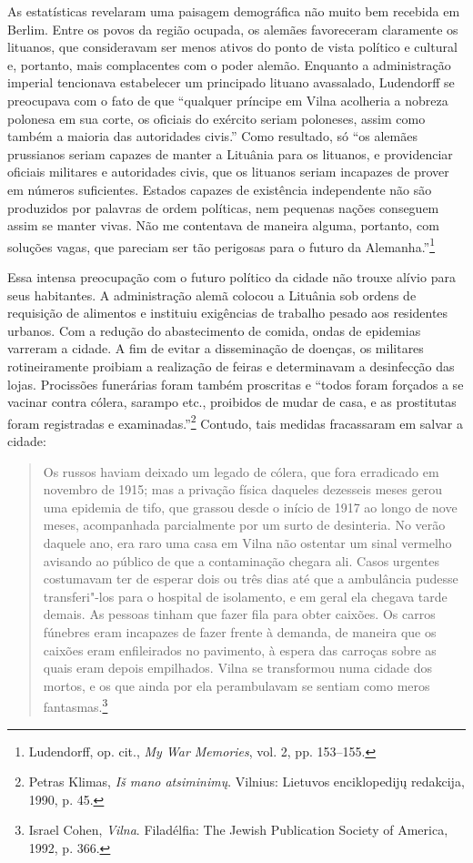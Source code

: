 As estatísticas revelaram uma paisagem demográfica não muito bem
recebida em Berlim. Entre os povos da região ocupada, os alemães
favoreceram claramente os lituanos, que consideravam ser menos ativos do
ponto de vista político e cultural e, portanto, mais complacentes com o
poder alemão. Enquanto a administração imperial tencionava estabelecer
um principado lituano avassalado, Ludendorff se preocupava com o fato de
que ``qualquer príncipe em Vilna acolheria a nobreza polonesa em sua
corte, os oficiais do exército seriam poloneses, assim como também a
maioria das autoridades civis.'' Como resultado, só ``os alemães
prussianos seriam capazes de manter a Lituânia para os lituanos, e
providenciar oficiais militares e autoridades civis, que os lituanos
seriam incapazes de prover em números suficientes. Estados capazes de
existência independente não são produzidos por palavras de ordem
políticas, nem pequenas nações conseguem assim se manter vivas. Não me
contentava de maneira alguma, portanto, com soluções vagas, que pareciam
ser tão perigosas para o futuro da Alemanha.''\footnote{Ludendorff, op. cit., \textit{My War Memories}, vol. 2, pp. 153--155.}

Essa intensa preocupação com o futuro político da cidade não trouxe
alívio para seus habitantes. A administração alemã colocou a Lituânia
sob ordens de requisição de alimentos e instituiu exigências de trabalho
pesado aos residentes urbanos. Com a redução do abastecimento de comida,
ondas de epidemias varreram a cidade. A fim de evitar a disseminação de
doenças, os militares rotineiramente proibiam a realização de feiras e
determinavam a desinfecção das lojas. Procissões funerárias foram também
proscritas e ``todos foram forçados a se vacinar contra cólera, sarampo
etc., proibidos de mudar de casa, e as prostitutas foram registradas e
examinadas.''\footnote{Petras Klimas, \textit{Iš mano atsiminimų}. Vilnius: Lietuvos enciklopedijų redakcija, 1990, p. 45.} Contudo, tais medidas fracassaram em salvar a cidade:

\begin{quote}
Os russos haviam deixado um legado de cólera, que fora erradicado em
novembro de 1915; mas a privação física daqueles dezesseis meses gerou
uma epidemia de tifo, que grassou desde o início de 1917 ao longo de
nove meses, acompanhada parcialmente por um surto de desinteria. No
verão daquele ano, era raro uma casa em Vilna não ostentar um sinal
vermelho avisando ao público de que a contaminação chegara ali. Casos
urgentes costumavam ter de esperar dois ou três dias até que a
ambulância pudesse transferi"-los para o hospital de isolamento, e em
geral ela chegava tarde demais. As pessoas tinham que fazer fila para
obter caixões. Os carros fúnebres eram incapazes de fazer frente à
demanda, de maneira que os caixões eram enfileirados no pavimento, à
espera das carroças sobre as quais eram depois empilhados. Vilna se
transformou numa cidade dos mortos, e os que ainda por ela perambulavam
se sentiam como meros fantasmas.\footnote{Israel Cohen, \textit{Vilna}. Filadélfia: The Jewish Publication Society of America, 1992, p. 366.} 
\end{quote}

